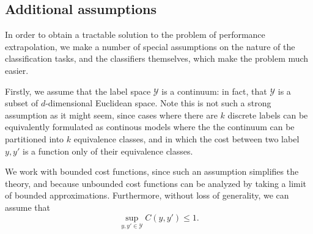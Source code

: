 \documentclass[12pt]{article}
\begin{document}
\subsection{Additional assumptions}

In order to obtain a tractable solution to the problem of performance
extrapolation, we make a number of special assumptions on the nature
of the classification tasks, and the classifiers themselves, which
make the problem much easier.

Firstly, we assume that the label space $\mathcal{Y}$ is a continuum:
in fact, that $\mathcal{Y}$ is a subset of $d$-dimensional Euclidean
space. Note this is not such a strong assumption as it might seem,
since cases where there are $k$ discrete labels can be equivalently
formulated as continous models where the the continuum can be
partitioned into $k$ equivalence classes, and in which the cost
between two label $y, y'$ is a function only of their equivalence
classes.

We work with bounded cost functions, since such an assumption
simplifies the theory, and because unbounded cost functions can be
analyzed by taking a limit of bounded approximations.  Furthermore,
without loss of generality, we can assume that
\[
\sup_{y, y'\in \mathcal{Y}} C(y, y') \leq 1.
\]
\end{document}
